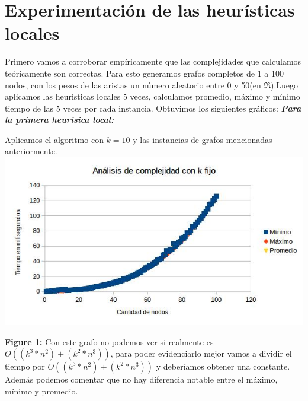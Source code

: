 \documentclass[a4paper]{article}
\begin{document}
\section{Experimentación de las heurísticas locales}
Primero vamos a corroborar empíricamente que las complejidades que calculamos teóricamente son correctas. Para esto generamos grafos completos de 1 a 100 nodos, con los pesos de las aristas un número aleatorio entre 0 y 50(en $\Re$).Luego aplicamos las heuristicas locales 5 veces, calculamos promedio, máximo y mínimo tiempo  de las 5 veces por cada instancia. Obtuvimos los siguientes gráficos:\newline
\textbf{\textit{Para la primera heurísica local:}\newline}

Aplicamos el algoritmo con $k=10$ y las instancias de grafos mencionadas anteriormente.\newline
\includegraphics[width=\textwidth,height=\textheight,keepaspectratio
]{local1Kfijo.jpg}
\begin {flushleft}
\textbf{Figure 1:} Con este grafo no podemos ver si realmente es $O((k^{3}*n^{2})+ (k^{2}*n^{3}))$, para poder evidenciarlo mejor vamos a dividir el tiempo por $O((k^{3}*n^{2})+ (k^{2}*n^{3}))$ y deberíamos obtener una constante. \newline
Además podemos comentar que no hay diferencia notable entre el máximo, mínimo y promedio.
\end{flushleft}
\end{document}
